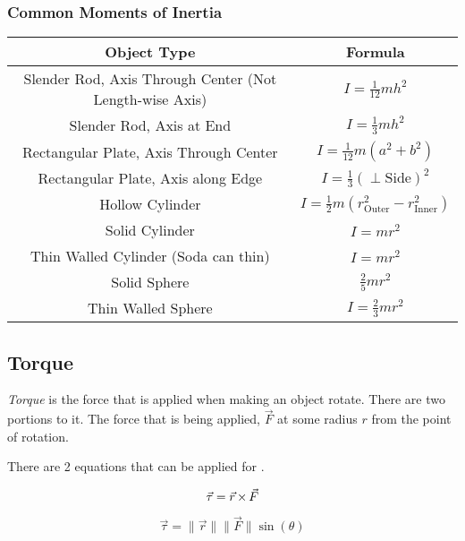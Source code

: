\subsubsection{Common Moments of Inertia} \label{subsubsec:Common Moments of Inertia}
\begin{table}[h!]
  \centering
  \renewcommand{\arraystretch}{1.5}
  \begin{tabular}{cc}
    Object Type & \nameref{def:Moment of Inertia} Formula \\ \hline
    Slender Rod, Axis Through Center (Not Length-wise Axis) & $I = \frac{1}{12} m h^{2}$ \\ \hline
    Slender Rod, Axis at End & $I = \frac{1}{3} m h^{2}$ \\ \hline
    Rectangular Plate, Axis Through Center & $I = \frac{1}{12} m \left( a^{2} + b^{2} \right)$ \\ \hline
    Rectangular Plate, Axis along Edge & $I = \frac{1}{3} \left( \perp \text{Side} \right)^{2}$ \\ \hline
    Hollow Cylinder & $I = \frac{1}{2} m \left( r_{\text{Outer}}^{2} - r_{\text{Inner}}^{2} \right)$ \\ \hline
    Solid Cylinder & $I = m r^{2}$ \\ \hline
    Thin Walled Cylinder (Soda can thin) & $I = m r^{2}$ \\ \hline
    Solid Sphere & $\frac{2}{5} m r^{2}$ \\ \hline
    Thin Walled Sphere & $I = \frac{2}{3} m r^{2}$ \\ \hline
  \end{tabular}
\end{table}

\subsection{Torque} \label{subsec:Torque}
\begin{definition}[Torque] \label{def:Torque}
  \emph{Torque} is the force that is applied when making an object rotate.
  There are two portions to it.
  The force that is being applied, $\vec{F}$ at some radius $r$ from the point of rotation.

  There are 2 equations that can be applied for .

  \begin{equation} \label{eq:Torque Cross Product}
    \vec{\tau} = \vec{r} \operatorname{\times} \vec{F}
  \end{equation}

  \begin{equation} \label{eq:Torque Magnitudes}
    \vec{\tau} = \lVert \vec{r} \rVert \lVert \vec{F} \rVert \sin (\theta)
  \end{equation}
\end{definition}

